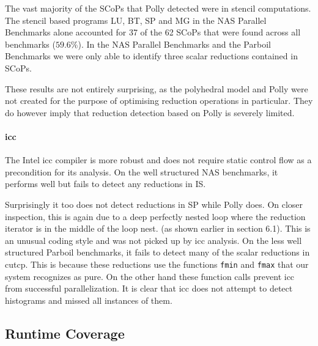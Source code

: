 The vast majority of the SCoPs that Polly detected were in stencil computations.
The stencil based programs LU, BT, SP and MG in the NAS Parallel Benchmarks alone accounted for 37 of the 62 SCoPs that were found across all benchmarks ($59.6\%$). 
In the NAS Parallel Benchmarks and the Parboil Benchmarks we were only able to identify three scalar reductions contained in SCoPs.

These results are not entirely surprising, as the polyhedral model and Polly were not created for the purpose of optimising reduction operations in particular.
They do however imply that reduction detection based on Polly is severely limited.

\paragraph{icc}
The Intel icc compiler is more robust and does not require static
control flow as a precondition for its analysis. On the well
structured NAS benchmarks, it performs well but fails to detect any
reductions in IS.

Surprisingly it too does not detect reductions in SP while Polly does. On
closer inspection, this is again due to a deep perfectly nested loop where
the reduction iterator is in the middle of the loop nest. (as shown
earlier in section 6.1).  This is an unusual coding style and was not
picked up by icc analysis. On the less well structured Parboil
benchmarks, it fails to detect many of the scalar reductions in cutcp.
This is because these reductions use the functions \texttt{fmin} and
\texttt{fmax} that our system recognizes as pure.  On the other hand
these function calls prevent icc from successful parallelization.
 It is clear that icc does not attempt to detect
histograms and missed all instances of them.

\subsection{Runtime Coverage}

